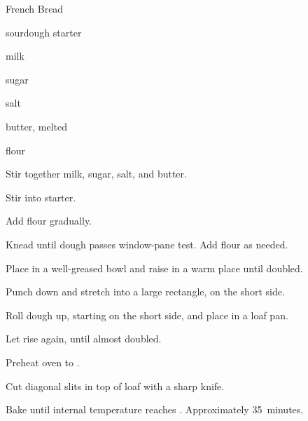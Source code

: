 \begin{recipe}{French Bread}{}{}

\begin{ingredients}
\item {} sourdough starter
\item \C{\half} milk
\item \Tp{1\eighth} sugar
\item \tp{2\quarter} salt
\item \C{\eighth} butter, melted
\item {} flour
\end{ingredients}

\begin{directions}

\item Stir together milk, sugar, salt, and butter.
\item Stir into starter.
\item Add flour gradually.
\item Knead until dough passes window-pane test. Add flour as needed.
\item Place in a well-greased bowl and raise in a warm place until doubled.
\item Punch down and stretch into a large rectangle,  on the short side.
\item Roll dough up, starting on the short side, and place in a loaf pan.
\item Let rise again, until almost doubled.
\item Preheat oven to .
\item Cut diagonal slits in top of loaf with a sharp knife.
\item Bake until internal temperature reaches . Approximately 35~minutes.
\end{directions}
\end{recipe}
